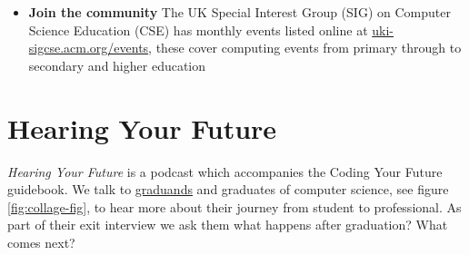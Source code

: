\documentclass[
  12pt,
]{book}
\providecommand{\tightlist}{%
  \setlength{\itemsep}{0pt}\setlength{\parskip}{0pt}}
\begin{document}
\begin{itemize}
  \begin{itemize}
  \tightlist
  \item
    Impact of Technology: How To Lead Classroom Discussions. Learn how to keep 14-16 year-old students engaged in discussions while teaching computer science. Supported by Google \href{https://www.futurelearn.com/courses/impact-of-technology}{futurelearn.com/courses/impact-of-technology}
  \item
    Teaching Physical Computing with Raspberry Pi and Python \href{https://www.futurelearn.com/courses/physical-computing-raspberry-pi-python}{futurelearn.com/courses/physical-computing-raspberry-pi-python}
  \item
    Since some of your teaching is likely to be asynchronous, you would also benefit from having a look at \href{https://www.open.edu/openlearn/education-development/education/take-your-teaching-online/content-section-overview}{taking your teaching online} from OpenLearn
  \item
    Many more Teaching Computing Courses at \href{https://www.futurelearn.com/subjects/teaching-courses/teaching-computing}{futurelearn.com/subjects/teaching-courses/teaching-computing}
  \end{itemize}
\item
  \textbf{Join the community} The UK Special Interest Group (SIG) on Computer Science Education (CSE) has monthly events listed online at \href{https://uki-sigcse.acm.org/events}{uki-sigcse.acm.org/events}, these cover computing events from primary through to secondary and higher education
\end{itemize}

\chapter{Hearing Your Future}\label{hearing-your-future}

\emph{Hearing Your Future} is a podcast which accompanies the Coding Your Future guidebook. We talk to \href{https://en.wiktionary.org/wiki/graduand}{graduands} and graduates of computer science, see figure \ref{fig:collage-fig}, to hear more about their journey from student to professional. As part of their exit interview we ask them what happens after graduation? What comes next?
\end{document}
